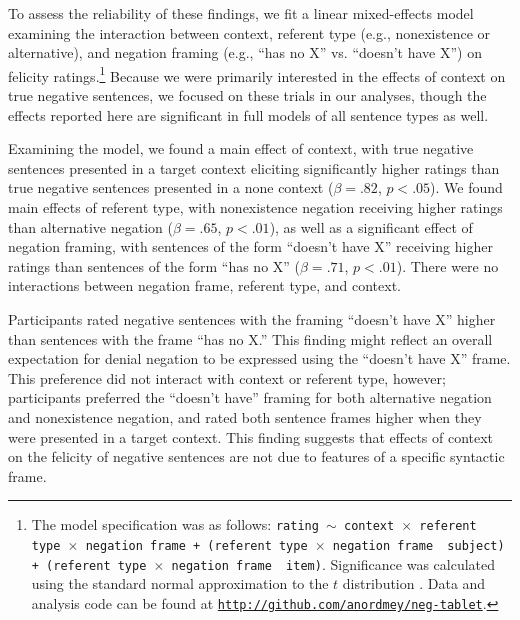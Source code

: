\documentclass[man, noapacite]{apa2}
\begin{document}
To assess the reliability of these findings, we fit a linear mixed-effects model examining the interaction between context, referent type (e.g., nonexistence or alternative), and negation framing (e.g., ``has no X'' vs. ``doesn't have X'') on felicity ratings.\footnote{The model specification was as follows: \texttt{rating $\sim$ context~$\times$~referent type~$\times$~negation frame + (referent type~$\times$~negation frame~\textbar~subject) + (referent type~$\times$~negation frame~\textbar~item)}. Significance was calculated using the standard normal approximation to the $t$ distribution \cite{barr2013}. Data and analysis code can be found at \href{http://github.com/anordmey/neg-tablet}{\nolinkurl{http://github.com/anordmey/neg-tablet}}.} Because we were primarily interested in the effects of context on true negative sentences, we focused on these trials in our analyses, though the effects reported here are significant in full models of all sentence types as well.

Examining the model, we found a main effect of context, with true negative sentences presented in a target context eliciting significantly higher ratings than true negative sentences presented in a none context ($\beta= .82$, $p< .05$). We found main effects of referent type, with nonexistence negation receiving higher ratings than alternative negation ($\beta= .65$, $p< .01$), as well as a significant effect of negation framing, with sentences of the form ``doesn't have X'' receiving higher ratings than sentences of the form ``has no X'' ($\beta= .71$, $p< .01$). There were no interactions between negation frame, referent type, and context.

Participants rated negative sentences with the framing ``doesn't have X'' higher than sentences with the frame ``has no X.'' This finding might reflect an overall expectation for denial negation to be expressed using the ``doesn't have X'' frame. This preference did not interact with context or referent type, however; participants preferred the ``doesn't have'' framing for both alternative negation and nonexistence negation, and rated both sentence frames higher when they were presented in a target context. This finding suggests that effects of context on the felicity of negative sentences are not due to features of a specific syntactic frame.
\end{document}
